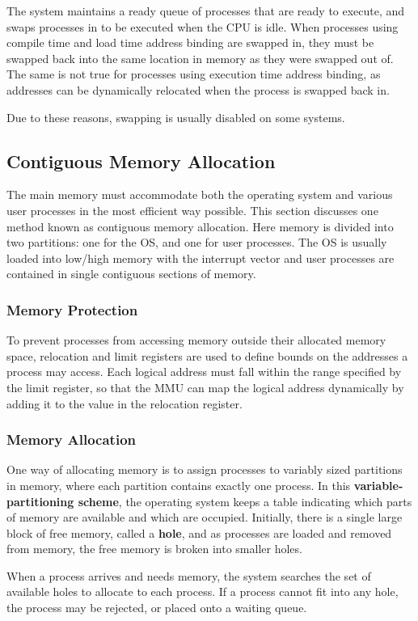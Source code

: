 \documentclass{article}
\begin{document}
The system maintains a ready queue of processes that are ready to
execute, and swaps processes in to be executed when the CPU is idle.
When processes using compile time and load time address binding are
swapped in, they must be swapped back into the same location in memory
as they were swapped out of. The same is not true for processes using
execution time address binding, as addresses can be dynamically
relocated when the process is swapped back in.

Due to these reasons, swapping is usually disabled on some systems.
\subsection{Contiguous Memory Allocation}
The main memory must accommodate both the operating system and various
user processes in the most efficient way possible. This section
discusses one method known as contiguous memory allocation. Here memory
is divided into two partitions: one for the OS, and one for user
processes. The OS is usually loaded into low/high memory with the
interrupt vector and user processes are contained in single contiguous
sections of memory.
\subsubsection{Memory Protection}
To prevent processes from accessing memory outside their allocated
memory space, relocation and limit registers are used to define bounds
on the addresses a process may access. Each logical address must fall
within the range specified by the limit register, so that the MMU can
map the logical address dynamically by adding it to the value in the
relocation register.
\subsubsection{Memory Allocation}
One way of allocating memory is to assign processes to variably sized
partitions in memory, where each partition contains exactly one
process. In this \textbf{variable-partitioning scheme}, the operating
system keeps a table indicating which parts of memory are available and
which are occupied. Initially, there is a single large block of free
memory, called a \textbf{hole}, and as processes are loaded and removed
from memory, the free memory is broken into smaller holes.

When a process arrives and needs memory, the system searches the set of
available holes to allocate to each process. If a process cannot fit
into any hole, the process may be rejected, or placed onto a waiting
queue.
\end{document}
